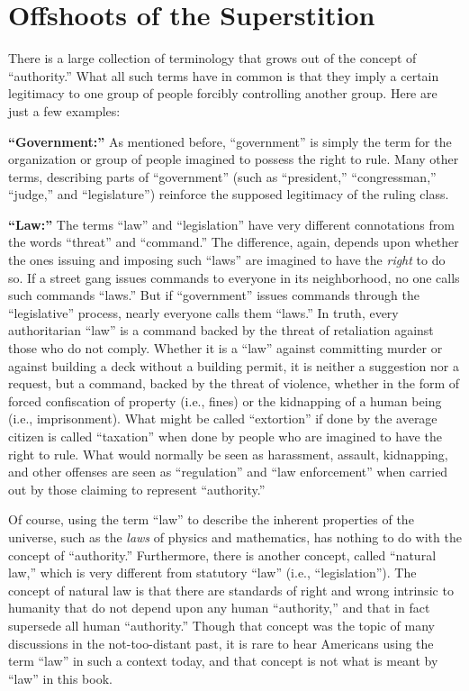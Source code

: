 \documentclass{book}
\begin{document}
\section{Offshoots of the Superstition}

There is a large collection of terminology that grows out of the concept of \enquote{authority.} What all such terms have in common is that they imply a certain legitimacy to one group of people forcibly controlling another group. Here are just a few examples:

\textbf{\enquote{Government:}} As mentioned before, \enquote{government} is simply the term for the organization or group of people imagined to possess the right to rule. Many other terms, describing parts of \enquote{government} (such as \enquote{president,} \enquote{congressman,} \enquote{judge,} and \enquote{legislature}) reinforce the supposed legitimacy of the ruling class.

\textbf{\enquote{Law:}} The terms \enquote{law} and \enquote{legislation} have very different connotations from the words \enquote{threat} and \enquote{command.} The difference, again, depends upon whether the ones issuing and imposing such \enquote{laws} are imagined to have the \emph{right} to do so. If a street gang issues commands to everyone in its neighborhood, no one calls such commands \enquote{laws.} But if \enquote{government} issues commands through the \enquote{legislative} process, nearly everyone calls them \enquote{laws.} In truth, every authoritarian \enquote{law} is a command backed by the threat of retaliation against those who do not comply. Whether it is a \enquote{law} against committing murder or against building a deck without a building permit, it is neither a suggestion nor a request, but a command, backed by the threat of violence, whether in the form of forced confiscation of property (i.e., fines) or the kidnapping of a human being (i.e., imprisonment). What might be called \enquote{extortion} if done by the average citizen is called \enquote{taxation} when done by people who are imagined to have the right to rule. What would normally be seen as harassment, assault, kidnapping, and other offenses are seen as \enquote{regulation} and \enquote{law enforcement} when carried out by those claiming to represent \enquote{authority.}

Of course, using the term \enquote{law} to describe the inherent properties of the universe, such as the \emph{laws} of physics and mathematics, has nothing to do with the concept of \enquote{authority.} Furthermore, there is another concept, called \enquote{natural law,} which is very different from statutory \enquote{law} (i.e., \enquote{legislation}). The concept of natural law is that there are standards of right and wrong intrinsic to humanity that do not depend upon any human \enquote{authority,} and that in fact supersede all human \enquote{authority.} Though that concept was the topic of many discussions in the not-too-distant past, it is rare to hear Americans using the term \enquote{law} in such a context today, and that concept is not what is meant by \enquote{law} in this book.
\end{document}
